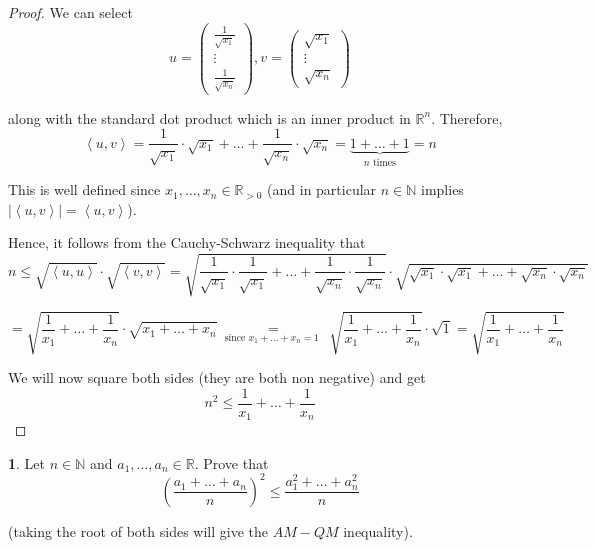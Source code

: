 \documentclass[english]{article}
\theoremstyle{definition}
\theoremstyle{plain}
\theoremstyle{plain}
\theoremstyle{definition}
\newtheorem*{problem*}{\protect\problemname}
\theoremstyle{definition}
\providecommand{\problemname}{Problem}
\begin{document}
\begin{proof}
We can select 
\[
u=\begin{pmatrix}\frac{1}{\sqrt{x_{1}}}\\
\vdots\\
\frac{1}{\sqrt{x_{n}}}
\end{pmatrix},v=\begin{pmatrix}\sqrt{x_{1}}\\
\vdots\\
\sqrt{x_{n}}
\end{pmatrix}
\]

along with the standard dot product which is an inner product in $\mathbb{R}^{n}$.
Therefore, 
\[
\left\langle u,v\right\rangle =\frac{1}{\sqrt{x_{1}}}\cdot\sqrt{x_{1}}+\dots+\frac{1}{\sqrt{x_{n}}}\cdot\sqrt{x_{n}}=\underset{n\text{ times}}{\underbrace{1+\dots+1}}=n
\]

This is well defined since $x_{1},\dots,x_{n}\in\mathbb{R}_{>0}$
(and in particular $n\in\mathbb{N}$ implies $\left|\left\langle u,v\right\rangle \right|=\left\langle u,v\right\rangle $).

Hence, it follows from the Cauchy-Schwarz inequality that
\[
n\le\sqrt{\left\langle u,u\right\rangle }\cdot\sqrt{\left\langle v,v\right\rangle }=\sqrt{\frac{1}{\sqrt{x_{1}}}\cdot\frac{1}{\sqrt{x_{1}}}+\dots+\frac{1}{\sqrt{x_{n}}}\cdot\frac{1}{\sqrt{x_{n}}}}\cdot\sqrt{\sqrt{x_{1}}\cdot\sqrt{x_{1}}+\dots+\sqrt{x_{n}}\cdot\sqrt{x_{n}}}
\]

\[
=\sqrt{\frac{1}{x_{1}}+\dots+\frac{1}{x_{n}}}\cdot\sqrt{x_{1}+\dots+x_{n}}\underset{\text{ since }x_{1}+\dots+x_{n}=1\text{ }}{=}\sqrt{\frac{1}{x_{1}}+\dots+\frac{1}{x_{n}}}\cdot\sqrt{1}=\sqrt{\frac{1}{x_{1}}+\dots+\frac{1}{x_{n}}}
\]

We will now square both sides (they are both non negative) and get
\[
n^{2}\le\frac{1}{x_{1}}+\dots+\frac{1}{x_{n}}
\]
\end{proof}
\begin{problem*}
Let $n\in\mathbb{N}$ and $a_{1},\dots,a_{n}\in\mathbb{R}$. Prove
that
\[
\left(\frac{a_{1}+\dots+a_{n}}{n}\right)^{2}\le\frac{a_{1}^{2}+\dots+a_{n}^{2}}{n}
\]

(taking the root of both sides will give the $AM-QM$ inequality). 
\end{problem*}
\end{document}
